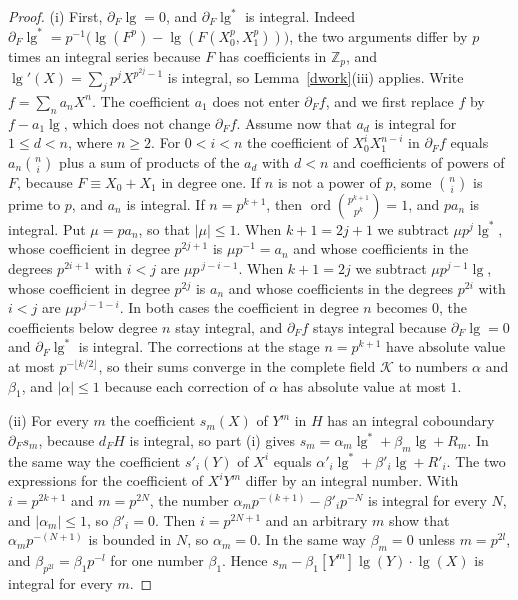 \begin{proof}
(i) First, $\partial_F\operatorname{lg}=0$, and $\partial_F\operatorname{lg}^\ast$ is integral. Indeed $\partial_F\operatorname{lg}^\ast=p^{-1}\big(\operatorname{lg}(F^p)-\operatorname{lg}(F(X_0^p,X_1^p))\big)$, the two arguments differ by $p$ times an integral series because $F$ has coefficients in $\mathbb Z_p$, and $\operatorname{lg}'(X)=\sum_jp^jX^{p^{2j}-1}$ is integral, so Lemma~\ref{dwork}(iii) applies. Write $f=\sum_na_nX^n$. The coefficient $a_1$ does not enter $\partial_Ff$, and we first replace $f$ by $f-a_1\operatorname{lg}$, which does not change $\partial_Ff$. Assume now that $a_d$ is integral for $1\le d<n$, where $n\ge2$. For $0<i<n$ the coefficient of $X_0^iX_1^{n-i}$ in $\partial_Ff$ equals $a_n\binom ni$ plus a sum of products of the $a_d$ with $d<n$ and coefficients of powers of $F$, because $F\equiv X_0+X_1$ in degree one. If $n$ is not a power of $p$, some $\binom ni$ is prime to $p$, and $a_n$ is integral. If $n=p^{k+1}$, then $\operatorname{ord}\binom{p^{k+1}}{p^k}=1$, and $pa_n$ is integral. Put $\mu=pa_n$, so that $\lvert\mu\rvert\le1$. When $k+1=2j+1$ we subtract $\mu p^j\operatorname{lg}^\ast$, whose coefficient in degree $p^{2j+1}$ is $\mu p^{-1}=a_n$ and whose coefficients in the degrees $p^{2i+1}$ with $i<j$ are $\mu p^{\,j-i-1}$. When $k+1=2j$ we subtract $\mu p^{j-1}\operatorname{lg}$, whose coefficient in degree $p^{2j}$ is $a_n$ and whose coefficients in the degrees $p^{2i}$ with $i<j$ are $\mu p^{\,j-1-i}$. In both cases the coefficient in degree $n$ becomes $0$, the coefficients below degree $n$ stay integral, and $\partial_Ff$ stays integral because $\partial_F\operatorname{lg}=0$ and $\partial_F\operatorname{lg}^\ast$ is integral. The corrections at the stage $n=p^{k+1}$ have absolute value at most $p^{-\lfloor k/2\rfloor}$, so their sums converge in the complete field $\mathcal K$ to numbers $\alpha$ and $\beta_1$, and $\lvert\alpha\rvert\le1$ because each correction of $\alpha$ has absolute value at most $1$.

(ii) For every $m$ the coefficient $s_m(X)$ of $Y^m$ in $H$ has an integral coboundary $\partial_Fs_m$, because $d_FH$ is integral, so part (i) gives $s_m=\alpha_m\operatorname{lg}^\ast+\beta_m\operatorname{lg}+R_m$. In the same way the coefficient $s'_i(Y)$ of $X^i$ equals $\alpha'_i\operatorname{lg}^\ast+\beta'_i\operatorname{lg}+R'_i$. The two expressions for the coefficient of $X^iY^m$ differ by an integral number. With $i=p^{2k+1}$ and $m=p^{2N}$, the number $\alpha_mp^{-(k+1)}-\beta'_ip^{-N}$ is integral for every $N$, and $\lvert\alpha_m\rvert\le1$, so $\beta'_i=0$. Then $i=p^{2N+1}$ and an arbitrary $m$ show that $\alpha_mp^{-(N+1)}$ is bounded in $N$, so $\alpha_m=0$. In the same way $\beta_m=0$ unless $m=p^{2l}$, and $\beta_{p^{2l}}=\beta_1p^{-l}$ for one number $\beta_1$. Hence $s_m-\beta_1[Y^m]\operatorname{lg}(Y)\cdot\operatorname{lg}(X)$ is integral for every $m$.
\end{proof}

